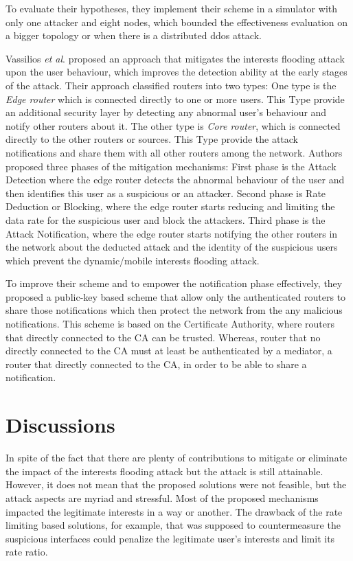 \documentclass[conference]{IEEEtran}
\begin{document}
To evaluate their hypotheses, they implement their scheme in a simulator with only one attacker and eight nodes, which bounded the effectiveness evaluation on a bigger topology or when there is a distributed ddos attack.

Vassilios \textit{et al}.\cite{Vassilakis2015} proposed an approach that mitigates the interests flooding attack upon the user behaviour, which improves the detection ability at the early stages of the attack. Their approach classified routers into two types: One type is the \textit{Edge router} which is connected directly to one or more users. This Type provide an additional security layer by detecting any abnormal user's behaviour and notify other routers about it. The other type is \textit{Core router}, which is connected directly to the other routers or sources. This Type provide the attack notifications and share them with all other routers among the network. Authors proposed three phases of the mitigation mechanisms: First phase is the Attack Detection where the edge router detects the abnormal behaviour of the user and then identifies this user as a suspicious or an attacker. Second phase is Rate Deduction or Blocking, where the edge router starts reducing and limiting the data rate for the suspicious user and block the attackers. Third phase is the Attack Notification, where the edge router starts notifying the other routers in the network about the deducted attack and the identity of the suspicious users which prevent the dynamic/mobile interests flooding attack.


To improve their scheme and to empower the notification phase effectively, they proposed a public-key based scheme that allow only the authenticated routers to share those notifications which then protect the network from the any malicious notifications. This scheme is based on the Certificate Authority, where routers that directly connected to the CA can be trusted. Whereas, router that no directly connected to the CA must at least be authenticated by a mediator, a router that directly connected to the CA, in order to be able to share a notification.      





\section{Discussions}

In spite of the fact that there are plenty of contributions to mitigate or eliminate the impact of the interests flooding attack but the attack is still attainable. However, it does not mean that the proposed solutions were not feasible, but the attack aspects are myriad and stressful. Most of the proposed mechanisms impacted the legitimate interests in a way or another. The drawback of the rate limiting based solutions, for example, that was supposed to countermeasure the suspicious interfaces could penalize the legitimate user's interests and limit its rate ratio.   
 
\end{document}
